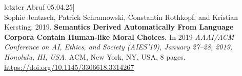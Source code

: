 letzter Abruf 05.04.25] \\
\newline
Sophie Jentzsch, Patrick Schramowski, Constantin Rothkopf, and Kristian
Kersting. 2019.
\textbf{Semantics Derived Automatically From Language Corpora
Contain Human-like Moral Choices.}
In 2019 \textit{AAAI/ACM Conference on AI,
Ethics, and Society (AIES’19), January 27–28, 2019, Honolulu, HI, USA.} ACM,
New York, NY, USA, 8 pages. \\
\href{https://doi.org/10.1145/3306618.3314267}{https://doi.org/10.1145/3306618.3314267}







